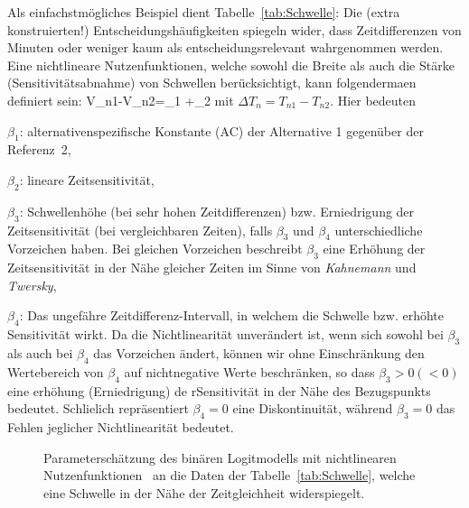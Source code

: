 Als einfachstm\"ogliches Beispiel dient  Tabelle~\ref{tab:Schwelle}: Die
(extra konstruierten!) Entscheidungsh\"aufigkeiten spiegeln wider,
dass Zeitdifferenzen von \unit[10]{Minuten} oder weniger kaum als
entscheidungsrelevant wahrgenommen werden.
Eine nichtlineare Nutzenfunktionen, welche sowohl die Breite als auch die
St\"arke (Sensitivit\"atsabnahme) von 
Schwellen
ber\"ucksichtigt, kann folgenderma\3en definiert sein: 
\be
\label{V-nichtlin1}
V_{n1}-V_{n2}=\beta_1 +\beta_2
\ee
mit $\Delta T_n=T_{n1}-T_{n2}$. 
Hier bedeuten
\bi
\item $\beta_1$: alternativenspezifische Konstante (AC) der Alternative 1
  gegen\"uber der Referenz~2,
\item $\beta_2$: lineare Zeitsensitivit\"at,
\item $\beta_3$: Schwellenh\"ohe (bei sehr hohen
  Zeitdifferenzen) bzw. Erniedrigung der 
  Zeitsensitivit\"at (bei vergleichbaren Zeiten), falls $\beta_3$
  und  $\beta_4$ unterschiedliche Vorzeichen haben.  Bei gleichen
  Vorzeichen beschreibt $\beta_3$ eine Erh\"ohung der
  Zeitsensitivit\"at in der N\"ahe gleicher Zeiten im Sinne von
  \emph{Kahnemann} und \emph{Twersky},
\item $\beta_4$: Das ungef\"ahre Zeitdifferenz-Intervall, in welchem die Schwelle
  bzw. erh\"ohte Sensitivit\"at wirkt. Da die Nichtlinearit\"at
  unver\"andert ist, wenn sich sowohl 
  bei $\beta_3$ als auch bei $\beta_4$ das Vorzeichen \"andert,
  k\"onnen wir ohne Einschr\"ankung den Wertebereich von $\beta_4$ auf
  nichtnegative Werte beschr\"anken, so dass $\beta_3>0 (<0)$ eine
  erh\"ohung (Erniedrigung) de rSensitivit\"at in der N\"ahe des
  Bezugspunkts bedeutet. Schlie\3lich repr\"asentiert $\beta_4=0$ eine
  Diskontinuit\"at, w\"ahrend $\beta_3=0$ das Fehlen jeglicher
  Nichtlinearit\"at bedeutet. 
\ei 

\begin{figure}
  \caption{\label{fig:nonlinUtility1}Parametersch\"atzung des
    bin\"aren Logitmodells mit
    nichtlinearen Nutzenfunktionen~ an die Daten der 
    Tabelle~\ref{tab:Schwelle}, welche eine Schwelle in der N\"ahe der
    Zeitgleichheit widerspiegelt. 
}
\end{figure}


